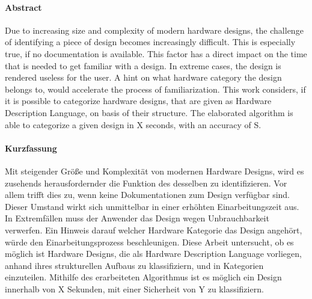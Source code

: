 
\paragraph{Abstract}
Due to increasing size and complexity of modern hardware designs, the challenge
of identifying a piece of design becomes increasingly difficult. This is especially
true, if no documentation is available. This factor has a direct impact on the 
time that is needed to get familiar with a design. In extreme cases, the design
is rendered useless for the user. A hint on what hardware category the design 
belongs to, would accelerate the process of familiarization.
This work considers, if it is possible to categorize hardware designs, that are
given as Hardware Description Language, on basis of their structure. 
The elaborated algorithm is able to categorize a given design in X seconds, with
an accuracy of S.

\paragraph{Kurzfassung}
Mit steigender Größe und Komplexität von modernen Hardware Designs, wird es 
zusehends herausfordernder die Funktion des desselben zu identifizieren. Vor
allem trifft dies zu, wenn keine Dokumentationen zum Design verfügbar sind. Dieser 
Umstand wirkt sich unmittelbar in einer erhöhten Einarbeitungszeit aus. In Extremfällen 
muss der Anwender das Design wegen Unbrauchbarkeit verwerfen. Ein Hinweis darauf welcher
Hardware Kategorie das Design angehört, würde den Einarbeitungsprozess beschleunigen.
Diese Arbeit untersucht, ob es möglich ist Hardware Designs, die als Hardware
Description Language vorliegen, anhand ihres strukturellen Aufbaus zu klassifiziern, 
und in Kategorien einzuteilen. 
Mithilfe des erarbeiteten Algorithmus ist es möglich ein Design innerhalb von X 
Sekunden, mit einer Sicherheit von Y zu klassifiziern. 
